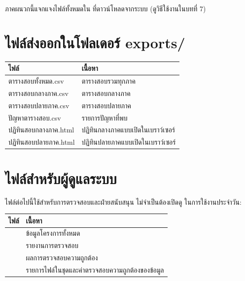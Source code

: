 
\noindent ภาคผนวกนี้แจกแจงไฟล์ทั้งหมดใน  ที่ดาวน์โหลดจากระบบ
(ดูวิธีใช้งานในบทที่ 7)

\section{ไฟล์ส่งออกในโฟลเดอร์ exports/}

\small
\begin{longtable}{L{6.5cm}L{8cm}}
\toprule
\textbf{ไฟล์} & \textbf{เนื้อหา} \\
\midrule
ตารางสอบทั้งหมด.csv & ตารางสอบรวมทุกภาค \\
ตารางสอบกลางภาค.csv & ตารางสอบกลางภาค \\
ตารางสอบปลายภาค.csv & ตารางสอบปลายภาค \\
ปัญหาตารางสอบ.csv & รายการปัญหาที่พบ \\
ปฏิทินสอบกลางภาค.html & ปฏิทินกลางภาคแบบเปิดในเบราว์เซอร์ \\
ปฏิทินสอบปลายภาค.html & ปฏิทินปลายภาคแบบเปิดในเบราว์เซอร์ \\
\bottomrule
\end{longtable}

\section{ไฟล์สำหรับผู้ดูแลระบบ}

ไฟล์ต่อไปนี้ใช้สำหรับการตรวจสอบและฝ่ายสนับสนุน ไม่จำเป็นต้องเปิดดู
ในการใช้งานประจำวัน:

\small
\begin{longtable}{L{5cm}L{9.5cm}}
\toprule
\textbf{ไฟล์} & \textbf{เนื้อหา} \\
\midrule
{} & ข้อมูลโครงการทั้งหมด \\
 & รายงานการตรวจสอบ \\
 & ผลการตรวจสอบความถูกต้อง \\
 & รายการไฟล์ในชุดและค่าตรวจสอบความถูกต้องของข้อมูล \\
\bottomrule
\end{longtable}
